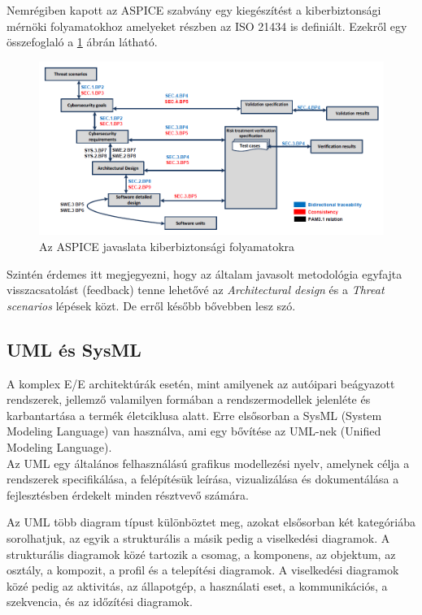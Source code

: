Nemrégiben kapott az ASPICE\cite{ASPICE} szabvány egy kiegészítést a kiberbiztonsági mérnöki folyamatokhoz amelyeket részben az ISO 21434 is definiált. Ezekről egy összefoglaló a \ref{fig:ASPICE} ábrán látható.

\begin{figure}[!ht]
\centering
\includegraphics[width=150mm, keepaspectratio]{figures/02_ASPICE.png}
\caption{Az ASPICE javaslata kiberbiztonsági folyamatokra\cite{ASPICE}}
\label{fig:ASPICE}
\end{figure}

Szintén érdemes itt megjegyezni, hogy az általam javasolt metodológia egyfajta visszacsatolást (feedback) tenne lehetővé az \textit{Architectural design} és a \textit{Threat scenarios} lépések közt. De erről később bővebben lesz szó.

\subsection{UML és SysML}

A komplex E/E architektúrák esetén, mint amilyenek az autóipari beágyazott rendszerek, jellemző valamilyen formában a rendszermodellek jelenléte és karbantartása a termék életciklusa alatt. Erre elsősorban a SysML (System Modeling Language) van használva, ami egy bővítése az UML-nek (Unified Modeling Language).\\

Az UML egy általános felhasználású grafikus modellezési nyelv, amelynek célja a rendszerek specifikálása, a felépítésük leírása, vizualizálása és dokumentálása a fejlesztésben érdekelt minden résztvevő számára.

Az UML több diagram típust különböztet meg, azokat elsősorban két kategóriába sorolhatjuk, az egyik a strukturális a másik pedig a viselkedési diagramok. A strukturális diagramok közé tartozik a csomag, a komponens, az objektum, az osztály, a kompozit, a profil és a telepítési diagramok. A viselkedési diagramok közé pedig az aktivitás, az állapotgép, a használati eset, a kommunikációs, a szekvencia, és az időzítési diagramok.

